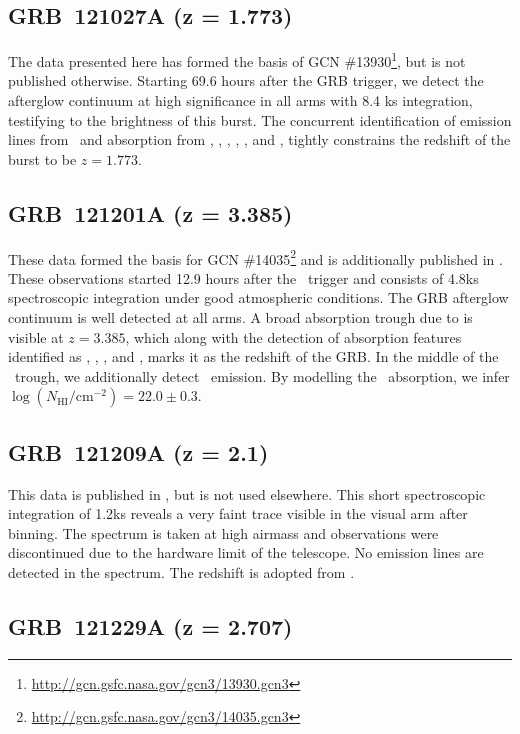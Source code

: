 \documentclass{aa}    %
\begin{document}
\subsection{GRB~121027A (z = 1.773)}

The data presented here has formed the basis of GCN
\#13930\footnote{\url{http://gcn.gsfc.nasa.gov/gcn3/13930.gcn3}}, but is not
published otherwise. Starting 69.6 hours after the GRB trigger, we detect the
afterglow continuum at high significance in all arms with 8.4 ks integration,
testifying to the brightness of this burst. The concurrent identification of
emission lines from \oiii~and absorption from \civ, \alii, \aliii, \mgi, \mgii,
and \feii, tightly constrains the redshift of the burst to be $z = 1.773$.

\subsection{GRB~121201A (z = 3.385)}

These data formed the basis for GCN
\#14035\footnote{\url{http://gcn.gsfc.nasa.gov/gcn3/14035.gcn3}} and is
additionally published in \citet{Kruhler2015}. These observations started 12.9
hours after the \swift~trigger and consists of 4.8ks spectroscopic integration
under good atmospheric conditions. The GRB afterglow continuum is well detected
at all arms. A broad absorption trough due to \lya is visible at $z = 3.385$,
which along with the detection of absorption features identified as \SIiv, \civ,
\alii, and \aliii, marks it as the redshift of the GRB. In the middle of the
\lya~trough, we additionally detect \lya~emission. By modelling the
\lya~absorption, we infer $\log (N_{\mathrm{HI}}/\mathrm{cm}^{-2}) = 22.0 \pm
0.3$.

\subsection{GRB~121209A (z = 2.1)}

This data is published in \citet{Kruhler2015}, but is not used elsewhere. This
short spectroscopic integration of 1.2ks reveals a very faint trace visible in
the visual arm after binning. The spectrum is taken at high airmass and
observations were discontinued due to the hardware limit of the telescope. No
emission lines are detected in the spectrum. The redshift is adopted from
\citet{Kruhler2015}.

\subsection{GRB~121229A (z = 2.707)}
\end{document}
